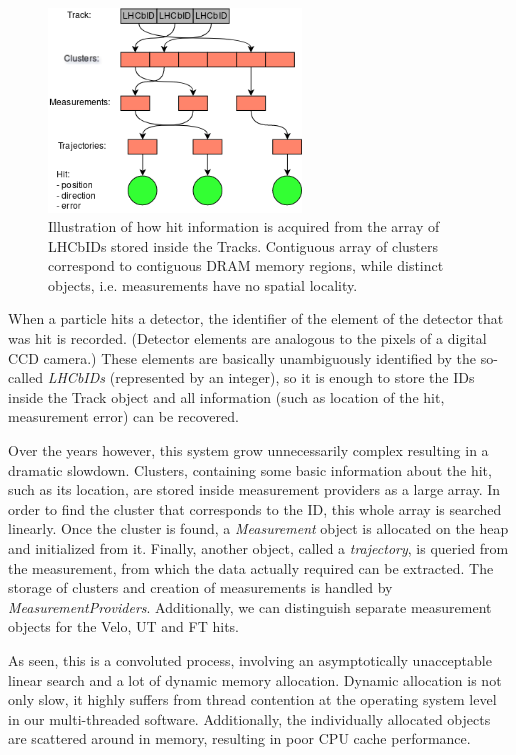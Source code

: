 \documentclass[12pt]{article}
\begin{document}
\begin{figure}[H]
	\begin{center}
		\includegraphics[width=0.6\textwidth]{kalmanfit_loadhits_schematic}
	\end{center}
	\caption{Illustration of how hit information is acquired from the array of LHCbIDs stored inside the Tracks. Contiguous array of clusters correspond to contiguous DRAM memory regions, while distinct objects, i.e. measurements have no spatial locality.}
	\label{fig_kalmanfit_loadhits_schematic}
\end{figure}

When a particle hits a detector, the identifier of the element of the detector that was hit is recorded. (Detector elements are analogous to the pixels of a digital CCD camera.) These elements are basically unambiguously identified by the so-called \textit{LHCbIDs} (represented by an integer), so it is enough to store the IDs inside the Track object and all information (such as location of the hit, measurement error) can be recovered. 

Over the years however, this system grow unnecessarily complex resulting in a dramatic slowdown. Clusters, containing some basic information about the hit, such as its location, are stored inside measurement providers as a large array. In order to find the cluster that corresponds to the ID, this whole array is searched linearly. Once the cluster is found, a \textit{Measurement} object is allocated on the heap and initialized from it. Finally, another object, called a \textit{trajectory}, is queried from the measurement, from which the data actually required can be extracted. The storage of clusters and creation of measurements is handled by \textit{MeasurementProviders}. Additionally, we can distinguish separate measurement objects for the Velo, UT and FT hits.

As seen, this is a convoluted process, involving an asymptotically unacceptable linear search and a lot of dynamic memory allocation. Dynamic allocation is not only slow, it highly suffers from thread contention at the operating system level in our multi-threaded software. Additionally, the individually allocated objects are scattered around in memory, resulting in poor CPU cache performance.
\end{document}
